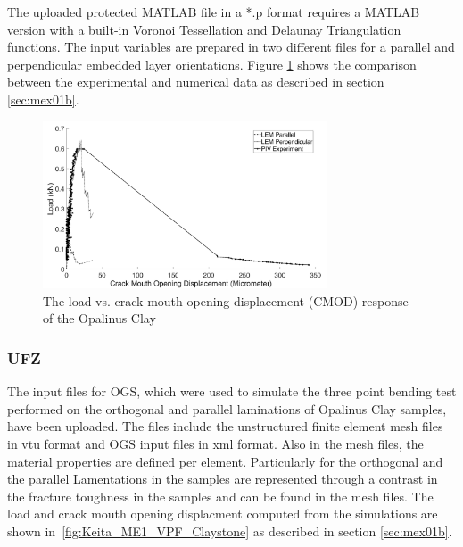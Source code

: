 The uploaded protected MATLAB file in a *.p format requires a MATLAB version with a built-in Voronoi Tessellation and Delaunay Triangulation functions. The input variables are prepared in two different files for a parallel and perpendicular embedded layer orientations. Figure \ref{fig:Amir_ME1_LEM_Claystone_Data} shows the comparison between the experimental and numerical data as described in section \ref {sec:mex01b}.

\begin{figure}[!ht]
\centering
\includegraphics[width=0.75\textwidth]{figures/Amir_ME1_LEM_Claystone_Data.png}
\caption{The load vs. crack mouth opening displacement (CMOD) response of the Opalinus Clay}
\label{fig:Amir_ME1_LEM_Claystone_Data}
\end{figure}

\subsubsection*{UFZ}
The input files for OGS, which were used to simulate the three point bending test performed on the orthogonal and parallel laminations of Opalinus Clay samples, have been uploaded.
The files include the unstructured finite element mesh files in vtu format and OGS input files in xml format.
Also in the mesh files, the material properties are defined per element. 
Particularly for the orthogonal and the parallel Lamentations in the samples are represented through a contrast in the fracture toughness in the samples and can be found in the mesh files.
The load and crack mouth opening displacment computed from the simulations are shown in~\ref{fig:Keita_ME1_VPF_Claystone} as described in section \ref {sec:mex01b}.

